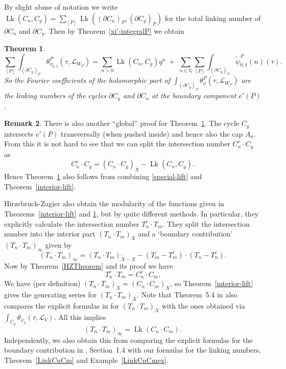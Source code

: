 \documentclass[12pt,leqno]{amsart}
\numberwithin{equation}{section}
\theoremstyle{plain}
\newtheorem{theorem}{Theorem}[section]
\theoremstyle{definition}
\newtheorem{remark}[theorem]{Remark}
\theoremstyle{remark}
\newcommand{\Q}{\mathbb{Q}}
\newcommand{\calL}{\mathcal{L}}
\newcommand{\Lk}{\operatorname{Lk}}
\begin{document}
By slight abuse of notation we write $\Lk(C_n,C_y) = \sum_{[P]} \Lk((\partial C_n)_P, (\partial C_y)_P)$ for the total linking number of $\partial C_n$ and $\partial C_y$. Then by Theorem~\ref{xi'-integralP} we obtain

\begin{theorem}\label{xi'-integral}
\[
\sum_{[P]}\int_{(\partial C_y)_P} \theta^P_{\phi_{0,1}}(\tau,\calL_{W_P}) = 
  \sum_{n>0}  \Lk(C_n,C_y) q^n
 \; + \; \sum_{n \in \Q} \sum_{[P]} \int_{(\partial C_y)_{P}}  {\tilde{\psi}_{0,1}^P}(n)(\tau).
\]
 So the Fourier coefficients of the holomorphic part of $\int_{(\partial C_y)_P} \theta^P_{\phi}(\tau,\calL_{W_P})$ are the linking numbers of the cycles $\partial C_y$ and $ \partial C_n$ at the boundary component $e'(P)$.  
 \end{theorem}

\begin{remark}
There is also another ``global'' proof for Theorem~\ref{xi'-integral}. The cycle $C_y$ intersects $e'(P)$ transversally (when pushed inside) and hence also the cap $A_n$. From this it is not hard to see that we can split the intersection number $C_n^c \cdot C_y$ as 
\[
C^c_n \cdot C_y  =  (C_n \cdot C_y)_X  -  \Lk(C_n,C_y).
\]
Hence Theorem~\ref{xi'-integral} also follows from combining \eqref{special-lift} and Theorem~\ref{interior-lift}. 
\end{remark}

Hirzebruch-Zagier also obtain the modularity of the functions given in Theorems~\ref{interior-lift} and \ref{xi'-integral}, but by quite different methods. In particular, they explicitly calculate the intersection number $T^c_n \cdot T_m$. They split the intersection number into the interior part $(T_n \cdot T_m)_X$ and a `boundary contribution' $(T_n \cdot T_m)_{\infty}$ given by 
 \[
 (T_n \cdot T_m )_{\infty} = (T_n \cdot T_m)_{\tilde{X}-X}  - ({T}_m-T_m^c) \cdot ({T}_n -T_n^c).
 \]
Now by Theorem~\ref{HZTheorem} and its proof we have
\[
T^c_n \cdot T_m = C^c_n \cdot C_m.
\]
We have (per definition) $(T_n \cdot T_m)_X = (C_n \cdot C_m)_X$, so Theorem~\ref{interior-lift} gives the generating series for $(T_n \cdot T_m)_X$. Note that Theorem~5.4 in \cite{FCompo} also compares the explicit formulas in \cite{HZ} for $(T_n \cdot T_m)_X$ with the ones obtained via  $\int_{C_y} \theta_{\varphi_2}(\tau,\calL_V)$. All this implies
\[
 (T_n \cdot T_m)_{\infty}  =\Lk( C_n \cdot C_m).
 \]
Independently, we also obtain this from comparing the explicit formulas for the boundary contribution in \cite{HZ}, Section~1.4 with our formulas for the linking numbers, Theorem~\ref{LinkCnCm} and Example~\ref{LinkCnCmex}.
\end{document}
